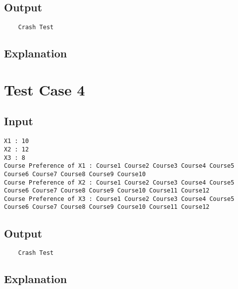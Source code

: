 \documentclass{article}
\begin{document}
\subsection*{Output}
\begin{verbatim}  
    Crash Test  
\end{verbatim}
\subsection*{Explanation}

\section*{Test Case 4}

\subsection*{Input}
\begin{verbatim}
X1 : 10
X2 : 12
X3 : 8
Course Preference of X1 : Course1 Course2 Course3 Course4 Course5 Course6 Course7 Course8 Course9 Course10 
Course Preference of X2 : Course1 Course2 Course3 Course4 Course5 Course6 Course7 Course8 Course9 Course10 Course11 Course12
Course Preference of X3 : Course1 Course2 Course3 Course4 Course5 Course6 Course7 Course8 Course9 Course10 Course11 Course12
\end{verbatim}
\subsection*{Output}
\begin{verbatim}    
    Crash Test
\end{verbatim}
\subsection*{Explanation}
\end{document}
